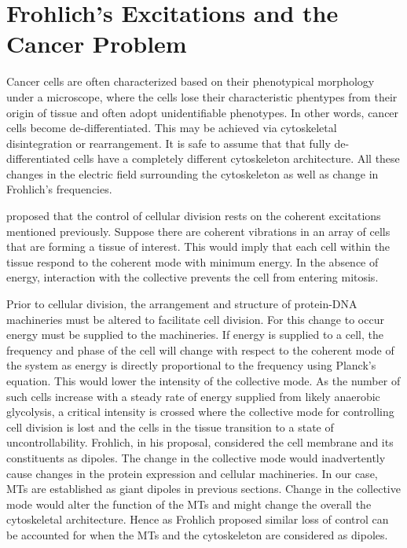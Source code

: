 \documentclass[letterpaper,final,times]{cas-dc}
\numberwithin{equation}{section}
\begin{document}
\section{Frohlich's Excitations and the Cancer Problem} \noindent
Cancer cells are often characterized based on their phenotypical morphology under a microscope, where the cells lose their characteristic phentypes from their origin of tissue and often adopt unidentifiable phenotypes. In other words, cancer cells become de-differentiated. This may be achieved via cytoskeletal disintegration or rearrangement. It is safe to assume that that fully de-differentiated cells have a completely different cytoskeleton architecture. All these changes in the electric field surrounding the cytoskeleton as well as change in Frohlich’s frequencies.

\citet{11} proposed that the control of cellular division rests on the coherent excitations mentioned previously. Suppose there are coherent vibrations in an array of cells that are forming a tissue of interest. This would imply that each cell within the tissue respond to the coherent mode with minimum energy. In the absence of energy, interaction with the collective prevents the cell from entering mitosis\citep{11}.

Prior to cellular division, the arrangement and structure of protein-DNA machineries must be altered to facilitate cell division. For this change to occur energy must be supplied to the machineries. If energy is supplied to a cell, the frequency and phase of the cell will change with respect to the coherent mode of the system as energy is directly proportional to the frequency using Planck’s equation. This would lower the intensity of the collective mode. As the number of such cells increase with a steady rate of energy supplied from likely anaerobic glycolysis, a critical intensity is crossed where the collective mode for controlling cell division is lost and the cells in the tissue transition to a state of uncontrollability\citep{11}. Frohlich, in his proposal, considered the cell membrane and its constituents as dipoles. The change in the collective mode would inadvertently cause changes in the protein expression and cellular machineries. In our case, MTs are established as giant dipoles in previous sections. Change in the collective mode would alter the function of the MTs and might change the overall the cytoskeletal architecture. Hence as Frohlich proposed similar loss of control can be accounted for when the MTs and the cytoskeleton are considered as dipoles.
\end{document}
